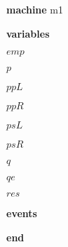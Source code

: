 \begin{block}
  \item   \textbf{machine} m1
  \item   \textbf{variables}
  \begin{block}
    \item   $emp$
    \item   $p$
    \item   $ppL$
    \item   $ppR$
    \item   $psL$
    \item   $psR$
    \item   $q$
    \item   $qe$
    \item   $res$
  \end{block}
  \item   
  \item   \textbf{events}
  \begin{block}
    \item   
    \item   
    \item   
    \item   
    \item   
    \item   
    \item   
    \item   
    \item   
    \item   
  \end{block}
  \item   \textbf{end} \\
\end{block}
